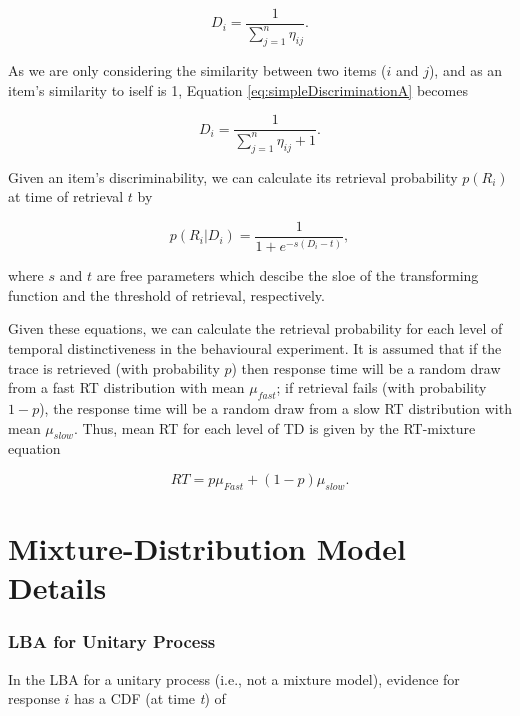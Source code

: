 \documentclass[a4paper, jou, natbib]{apa6}
\begin{document}
\begin{equation}
D_{i} = \frac{1}{\sum\limits_{j = 1}^n \eta_{ij}}.
\label{eq:simpleDiscriminationA}
\end{equation}

As we are only considering the similarity between two items ($i$ and $j$), and as an item's similarity to iself is 1, Equation \ref{eq:simpleDiscriminationA} becomes

\begin{equation}
D_{i} = \frac{1}{\sum\limits_{j = 1}^n \eta_{ij} + 1}.
\label{eq:simpleDiscriminationB}
\end{equation}

Given an item's discriminability, we can calculate its retrieval probability $p(R_{i})$ at time of retrieval $t$ by

\begin{equation}
p(R_{i}|D_{i}) = \frac{1}{1 + e^{-s(D_{i} - t)}}, 
\label{eq:simpleProb}
\end{equation}

\noindent where $s$ and $t$ are free parameters which descibe the sloe of the transforming function and the threshold of retrieval, respectively. 

Given these equations, we can calculate the retrieval probability for each level of temporal distinctiveness in the behavioural experiment. It is assumed that if the trace is retrieved (with probability $p$) then response time will be a random draw from a fast RT distribution with mean $\mu_{fast}$; if retrieval fails (with probability $1 - p$), the response time will be a random draw from a slow RT distribution with mean $\mu_{slow}$. Thus, mean RT for each level of TD is given by the RT-mixture equation

\begin{equation}
RT = p\mu_{Fast} + (1 - p)\mu_{slow}.
\label{eq:tdMixtureNew}
\end{equation}
\appendix
\section{Mixture-Distribution Model Details}

\subsubsection{LBA for Unitary Process}
In the LBA for a unitary process (i.e., not a mixture model), evidence for response $i$ has a CDF (at time \emph{t}) of
\end{document}
